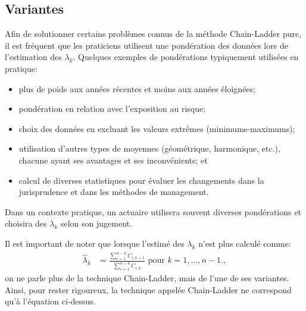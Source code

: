 \subsection{Variantes}
\label{sec:deterministe:CL:variantes}

Afin de solutionner certains problèmes connus de la méthode
Chain-Ladder pure, il est fréquent que les praticiens utilisent
une pondération des données lors de l'estimation des
$\lambda_k$. Quelques exemples de pondérations typiquement utilisées
en pratique:
\begin{itemize}
\item plus de poids aux années récentes et moins aux années éloignées;
\item pondération en relation avec l'exposition au risque;
\item choix des données en excluant les valeurs extrêmes (minimums-maximums);
\item utilisation d'autres types de moyennes (géométrique, harmonique,
  etc.), chacune ayant ses avantages et ses inconvénients; et
\item calcul de diverses statistiques pour évaluer les changements
  dans la jurisprudence et dans les méthodes de management.
\end{itemize}
Dans un contexte pratique, un actuaire utilisera souvent diverses
pondérations et choisira des $\lambda_k$ selon son jugement.

Il est important de noter que lorsque l'estimé des $\lambda_k$ n'est
plus calculé comme:
\begin{align*}
  \hat{\lambda}_k &= \frac{\sum_{i=1}^{n-k} C_{i,k+1}}{\sum_{i=1}^{n-k} C_{i,k}} \text{ pour } k=1,\ldots,n-1.,
\end{align*}
on ne parle plus de la technique Chain-Ladder, mais de l'une de ses
variantes. Ainsi, pour rester rigoureux, la technique appelée
Chain-Ladder ne correspond qu'à l'équation ci-dessus.

